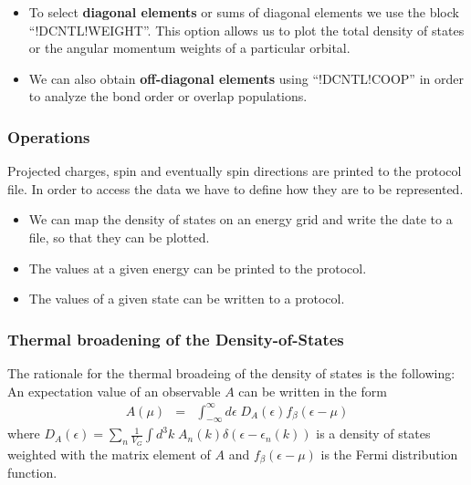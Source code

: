 \documentclass[final,12pt]{article}
\begin{document}
{{{{{{\begin{itemize}

\item To select {\bf diagonal elements} or sums of diagonal elements we use
  the block ``!DCNTL!WEIGHT''. This option allows us to plot the
  total density of states or the angular momentum weights of a
  particular orbital.

\item We can also obtain {\bf off-diagonal elements} using
  ``!DCNTL!COOP'' in order to analyze the bond order or overlap
  populations.

\end{itemize}

\subsubsection{Operations}
Projected charges, spin and eventually spin directions are printed to
the protocol file.  In order to access the data we have to define how
they are to be represented.
\begin{itemize}
\item We can map the density of states on an energy grid and write the
date to a file, so that they can be plotted.
\item The values at a given energy can be printed to the protocol.
\item The values of a given state can be written to a protocol.
\end{itemize}

\subsubsection{Thermal broadening of the Density-of-States}
\label{sec:thermoalbroadening}
The rationale for the thermal broadeing of the density of states is
the following: An expectation value of an observable $A$ can be
written in the form
\begin{eqnarray}
A(\mu)&=&\int_{-\infty}^\infty d\epsilon\; D_A(\epsilon) f_\beta(\epsilon-\mu)
\label{eq:aofmu}
\end{eqnarray}
where $D_A(\epsilon)=\sum_n\frac{1}{V_G}\int d^3k\;
A_n(k)\delta(\epsilon-\epsilon_n(k))$ is a density of states
weighted with the matrix element of $A$ and $f_{\beta}(\epsilon-\mu)$
is the Fermi distribution function.

}}}}}}
\end{document}
